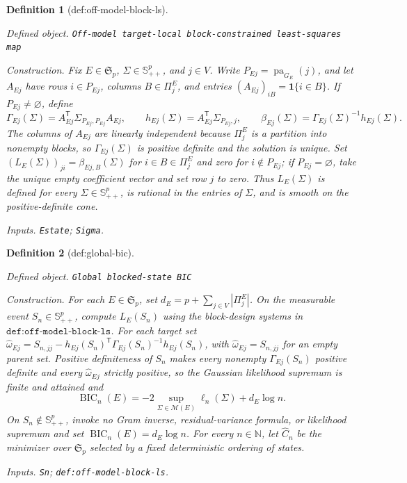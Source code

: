 \documentclass{article}
\newtheorem{definition}{Definition}
\begin{document}
\begin{definition}[def:off-model-block-ls]\label{def:off-model-block-ls}
\par\smallskip\noindent\emph{Defined object.} \texttt{Off-\allowbreak{}model target-\allowbreak{}local block-\allowbreak{}constrained least-\allowbreak{}squares map}
\par\smallskip\noindent\emph{Construction.} Fix \(E\in\mathfrak S_p\), \(\Sigma\in\mathbb S^p_{++}\), and \(j\in V\). Write \(P_{Ej}=\operatorname{pa}_{G_E}(j)\), and let \(A_{Ej}\) have rows \(i\in P_{Ej}\), columns \(B\in\Pi^E_j\), and entries \((A_{Ej})_{iB}=\mathbf 1\{i\in B\}\). If \(P_{Ej}\neq\varnothing\), define \[\Gamma_{Ej}(\Sigma)=A_{Ej}^{\mathsf T}\Sigma_{P_{Ej},P_{Ej}}A_{Ej},\qquad h_{Ej}(\Sigma)=A_{Ej}^{\mathsf T}\Sigma_{P_{Ej},j},\qquad \beta_{Ej}(\Sigma)=\Gamma_{Ej}(\Sigma)^{-1}h_{Ej}(\Sigma).\] The columns of \(A_{Ej}\) are linearly independent because \(\Pi^E_j\) is a partition into nonempty blocks, so \(\Gamma_{Ej}(\Sigma)\) is positive definite and the solution is unique. Set \((L_E(\Sigma))_{ji}=\beta_{Ej,B}(\Sigma)\) for \(i\in B\in\Pi^E_j\) and zero for \(i\notin P_{Ej}\); if \(P_{Ej}=\varnothing\), take the unique empty coefficient vector and set row \(j\) to zero. Thus \(L_E(\Sigma)\) is defined for every \(\Sigma\in\mathbb S^p_{++}\), is rational in the entries of \(\Sigma\), and is smooth on the positive-definite cone.
\par\smallskip\noindent\emph{Inputs.} \texttt{Estate}; \texttt{Sigma}.
\end{definition}

\begin{definition}[def:global-bic]\label{def:global-bic}
\par\smallskip\noindent\emph{Defined object.} \texttt{Global blocked-\allowbreak{}state BIC}
\par\smallskip\noindent\emph{Construction.} For each \(E\in\mathfrak S_p\), set \(d_E=p+\sum_{j\in V}|\Pi^E_j|\). On the measurable event \(S_n\in\mathbb S^p_{++}\), compute \(L_E(S_n)\) using the block-design systems in \(\texttt{def:off-model-block-ls}\). For each target set \(\widehat\omega_{Ej}=S_{n,jj}-h_{Ej}(S_n)^{\mathsf T}\Gamma_{Ej}(S_n)^{-1}h_{Ej}(S_n)\), with \(\widehat\omega_{Ej}=S_{n,jj}\) for an empty parent set. Positive definiteness of \(S_n\) makes every nonempty \(\Gamma_{Ej}(S_n)\) positive definite and every \(\widehat\omega_{Ej}\) strictly positive, so the Gaussian likelihood supremum is finite and attained and \[\operatorname{BIC}_n(E)=-2\sup_{\Sigma\in\mathcal M(E)}\ell_n(\Sigma)+d_E\log n.\] On \(S_n\notin\mathbb S^p_{++}\), invoke no Gram inverse, residual-variance formula, or likelihood supremum and set \(\operatorname{BIC}_n(E)=d_E\log n\). For every \(n\in\mathbb N\), let \(\widehat C_n\) be the minimizer over \(\mathfrak S_p\) selected by a fixed deterministic ordering of states.
\par\smallskip\noindent\emph{Inputs.} \texttt{Sn}; \texttt{def:\allowbreak{}off-\allowbreak{}model-\allowbreak{}block-\allowbreak{}ls}.
\end{definition}
\end{document}
